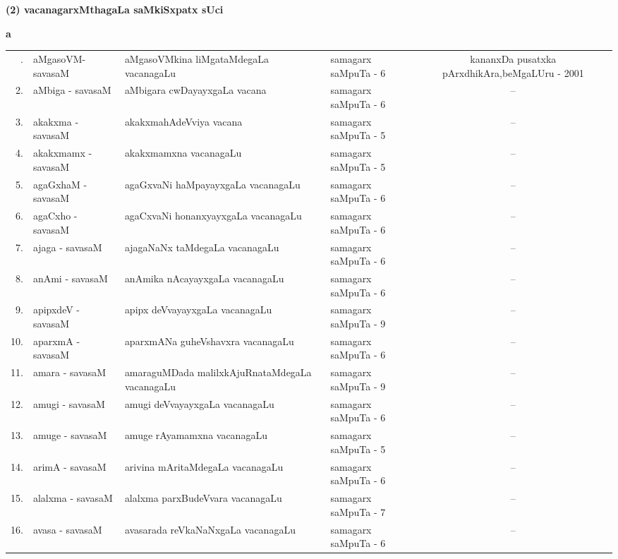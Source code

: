 \newpage

\begin{center}
{\large\bf (2) vacanagarxMthagaLa saMkiSxpatx sUci}
\end{center}

\medskip

\centerline{\bf a}

\medskip

{\renewcommand{\arraystretch}{1.35}
\begin{longtable}{rl>{\raggedright}p{5.5cm}lc}
\endfirsthead
\endhead
\endfoot
\endlastfoot
1. & aMgasoVM-savasaM & aMgasoVMkina liMgataMdegaLa vacanagaLu & samagarx saMpuTa - 6 & \multicolumn{1}{p{3.5cm}}{kananxDa pusatxka pArxdhikAra,\newline beMgaLUru - 2001}\\
2. & aMbiga - savasaM & aMbigara cwDayayxgaLa vacana & samagarx saMpuTa - 6 & --\\
3. & akakxma - savasaM & akakxmahAdeVviya vacana & samagarx saMpuTa - 5 & --\\
4. & akakxmamx - savasaM & akakxmamxna vacanagaLu & samagarx saMpuTa - 5 & --\\
5. & agaGxhaM - savasaM & agaGxvaNi haMpayayxgaLa vacanagaLu & samagarx saMpuTa - 6 & --\\
6. & agaCxho - savasaM & agaCxvaNi honanxyayxgaLa vacanagaLu & samagarx saMpuTa - 6 & --\\
7. & ajaga - savasaM & ajagaNaNx taMdegaLa vacanagaLu & samagarx saMpuTa - 6 & --\\
8. & anAmi - savasaM & anAmika nAcayayxgaLa vacanagaLu & samagarx saMpuTa - 6 & --\\
9. & apipxdeV - savasaM & apipx deVvayayxgaLa vacanagaLu & samagarx saMpuTa - 9 & --\\
10. & aparxmA - savasaM & aparxmANa guheVshavxra vacanagaLu & samagarx saMpuTa - 6 & --\\
11. & amara - savasaM & amaraguMDada malilxkAjuRna\newline taMdegaLa vacanagaLu & samagarx saMpuTa - 9 & --\\
12. & amugi - savasaM & amugi deVvayayxgaLa vacanagaLu & samagarx saMpuTa - 6 & --\\
13. & amuge - savasaM & amuge rAyamamxna vacanagaLu & samagarx saMpuTa - 5 & --\\
14. & arimA - savasaM & arivina mAritaMdegaLa vacanagaLu & samagarx saMpuTa - 6 & --\\
15. & alalxma - savasaM & alalxma parxBudeVvara vacanagaLu & samagarx saMpuTa - 7 & --\\
16. & avasa - savasaM &  avasarada reVkaNaNxgaLa vacanagaLu & samagarx saMpuTa - 6 & --\\
\end{longtable}}
\bigskip

